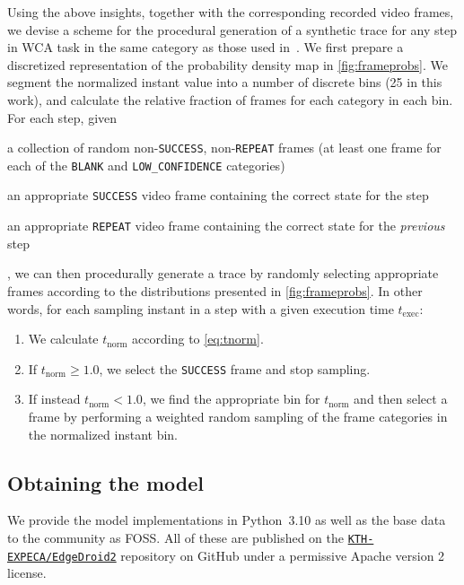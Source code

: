 Using the above insights, together with the corresponding recorded video frames, we devise a scheme for the procedural generation of a synthetic trace for any step in \ac{WCA} task in the same category as those used in~\cite{olguinmunoz:impact2021}.
We first prepare a discretized representation of the probability density map in \cref{fig:frameprobs}.
We segment the normalized instant value into a number of discrete bins (\num{25} in this work), and calculate the relative fraction of frames for each category in each bin.
For each step, given
\begin{enumerate*}[itemjoin={{; }}, itemjoin*={{; and }}]
    \item a collection of random non-\texttt{SUCCESS}, non-\texttt{REPEAT} frames (at least one frame for each of the \texttt{BLANK} and \texttt{LOW\_CONFIDENCE} categories)
    \item an appropriate \texttt{SUCCESS} video frame containing the correct state for the step
    \item an appropriate \texttt{REPEAT} video frame containing the correct state for the \emph{previous} step
\end{enumerate*},
we can then procedurally generate a trace by randomly selecting appropriate frames according to the distributions presented in \cref{fig:frameprobs}.
In other words, for each sampling instant in a step with a given execution time \( t_\text{exec} \):
\begin{enumerate}
    \item We calculate \( t_\text{norm} \) according to \cref{eq:tnorm}.
    \item If \( t_\text{norm} \ge 1.0 \), we select the \texttt{SUCCESS} frame and stop sampling.
    \item If instead \( t_\text{norm} < 1.0 \), we find the appropriate bin for \( t_\text{norm} \) and then select a frame by performing a weighted random sampling of the frame categories in the normalized instant bin.
\end{enumerate}

\subsection{Obtaining the model}\label{ssec:model:obtaining}

We provide the model implementations in Python~\num{3.10} as well as the base data to the community as \ac{FOSS}.
All of these are published on the \href{https://github.com/KTH-EXPECA/EdgeDroid2}{\texttt{KTH-EXPECA/EdgeDroid2}} repository on GitHub under a permissive Apache version 2 license.